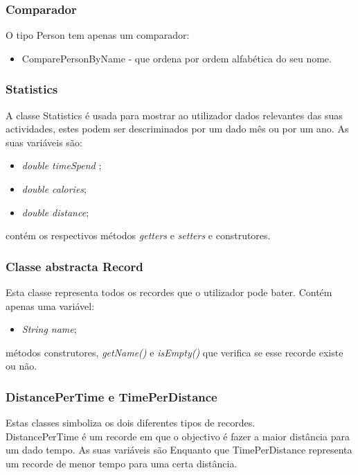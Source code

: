 \documentclass[10pt,notitlepage]{article}
\begin{document}
\subsubsection{Comparador}
O tipo Person tem apenas um comparador:
\begin{itemize}
\item ComparePersonByName - que ordena por ordem alfabética do seu nome.
\end{itemize}


\subsubsection{Statistics}

A classe Statistics é usada para mostrar ao utilizador dados relevantes das suas actividades, estes podem ser descriminados por um dado mês ou por um ano. As suas variáveis são:
\begin{itemize}
\item \textit{double timeSpend} ;
\item \textit{double calories};
\item \textit{double distance};
\end{itemize}
contém os respectivos métodos \textit{getters} e \textit{setters} e construtores.



\subsubsection{Classe abstracta Record}

Esta classe representa todos os recordes que o utilizador pode bater. Contém apenas uma variável:
\begin{itemize}
\item \textit{String name};
\end{itemize}
métodos construtores, \textit{getName()} e \textit{isEmpty()} que verifica se esse recorde existe ou não.


\subsubsection{DistancePerTime e TimePerDistance}
Estas classes simboliza os dois diferentes tipos de recordes.\\

DistancePerTime é um recorde em que o objectivo é fazer a maior distância para um  dado tempo.  
As suas variáveis são
Enquanto que TimePerDistance representa um recorde de menor tempo para uma certa distância.\\
\end{document}

